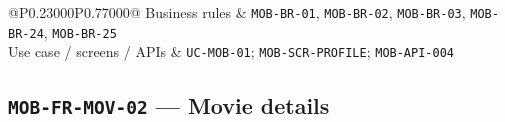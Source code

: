 \begin{longtable}{@{}P{0.23000\SRSWidth}P{0.77000\SRSWidth}@{}}
Business rules & \texttt{MOB-\allowbreak{}BR-\allowbreak{}01}, \texttt{MOB-\allowbreak{}BR-\allowbreak{}02}, \texttt{MOB-\allowbreak{}BR-\allowbreak{}03}, \texttt{MOB-\allowbreak{}BR-\allowbreak{}24}, \texttt{MOB-\allowbreak{}BR-\allowbreak{}25} \\[3pt]
Use case /\allowbreak{} screens /\allowbreak{} APIs & \texttt{UC-\allowbreak{}MOB-\allowbreak{}01}; \texttt{MOB-\allowbreak{}SCR-\allowbreak{}PROFILE}; \texttt{MOB-\allowbreak{}API-\allowbreak{}004} \\[3pt]
\end{longtable}
\endgroup

\subsection{\texttt{MOB-\allowbreak{}FR-\allowbreak{}MOV-\allowbreak{}02} — Movie details}
\begingroup
\fontsize{9.5}{12}\selectfont
\setlength{\SRSWidth}{\dimexpr\linewidth-2\tabcolsep\relax}

